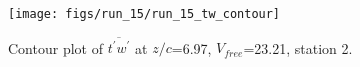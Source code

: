 \begin{figure}[H]
\centering
\texttt{[image: figs/run\_15/run\_15\_tw\_contour]}
\caption{Contour plot of $\overline{t^\prime w^\prime}$ at $z/c$=6.97, $V_{free}$=23.21, station 2.}
\label{fig:run_15_tw_contour}
\end{figure}


